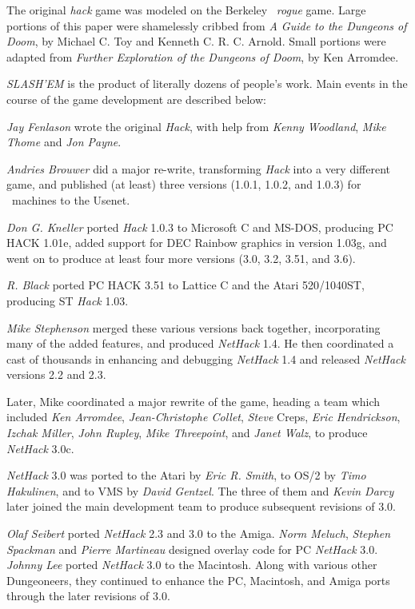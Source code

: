 
The original {\it hack\/} game was modeled on the Berkeley 
\UNIX\ 
{\it rogue\/} game.  Large portions of this paper were shamelessly
cribbed from {\it A Guide to the Dungeons of Doom}, by Michael C. Toy
and Kenneth C. R. C. Arnold.  Small portions were adapted from
{\it Further Exploration of the Dungeons of Doom}, by Ken Arromdee.

{\it SLASH'EM\/} is the product of literally dozens of people's work.
Main events in the course of the game development are described below:


{\it Jay Fenlason\/} wrote the original {\it Hack}, with help from
{\it Kenny Woodland}, {\it Mike Thome\/} and {\it Jon Payne}.

{\it Andries Brouwer\/} did a major re-write, transforming {\it Hack\/} into a
very different game, and published (at least) three versions (1.0.1,
1.0.2, and 1.0.3) for
\UNIX\ 
machines to the Usenet.

{\it Don G. Kneller\/} ported {\it Hack\/} 1.0.3 to Microsoft C and MS-DOS, producing PC
HACK 1.01e, added support for DEC Rainbow graphics in version 1.03g, and went
on to produce at least four more versions (3.0, 3.2, 3.51, and 3.6).

{\it R. Black\/} ported PC HACK 3.51 to Lattice C and the Atari 520/1040ST,
producing ST {\it Hack\/} 1.03.

{\it Mike Stephenson\/} merged these various versions back together,
incorporating many of the added features, and produced {\it NetHack\/} 1.4.
He then coordinated a cast of thousands in enhancing and debugging
{\it NetHack\/} 1.4 and released {\it NetHack\/} versions 2.2 and 2.3.

Later, Mike coordinated a major rewrite of the game, heading a
team which included {\it Ken Arromdee}, {\it Jean-Christophe Collet}, {\it Steve}
Creps, {\it Eric Hendrickson}, {\it Izchak Miller}, {\it John Rupley},
{\it Mike Threepoint}, and {\it Janet Walz}, to produce {\it NetHack\/} 3.0c.

{\it NetHack\/} 3.0 was ported to the Atari by {\it Eric R. Smith}, to OS/2 by
{\it Timo Hakulinen}, and to VMS by {\it David Gentzel}.  The three of them
and {\it Kevin Darcy\/} later joined the main development team to produce
subsequent revisions of 3.0.

{\it Olaf Seibert\/} ported {\it NetHack\/} 2.3 and 3.0 to the Amiga.
{\it Norm Meluch}, {\it Stephen Spackman\/} and {\it Pierre Martineau\/} designed
overlay code for PC {\it NetHack\/} 3.0.  {\it Johnny Lee\/} ported
{\it NetHack\/} 3.0 to the Macintosh.  Along with various other Dungeoneers, they
continued to enhance the PC, Macintosh, and Amiga ports through the later
revisions of 3.0.

